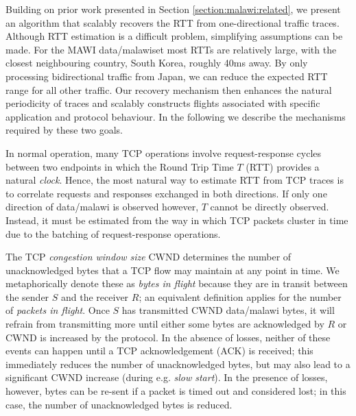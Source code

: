 Building on prior work presented in Section \ref{section:malawi:related}, we present an algorithm that scalably recovers the RTT from one-directional traffic traces. 
Although RTT estimation is a difficult problem, simplifying assumptions
can be made.
For the MAWI data/malawiset most RTTs are relatively large, with the closest neighbouring country, South Korea, roughly 40ms away.
By only processing bidirectional traffic from Japan, we can reduce the expected RTT range for all other traffic.
Our recovery mechanism then enhances the natural periodicity of traces and scalably constructs flights associated with specific application and protocol behaviour.
In the following we describe the mechanisms required by these two goals. 

%
%
In normal operation, many TCP operations involve request-response cycles between two endpoints in which the Round Trip Time $T$ (RTT) provides a natural \emph{clock}. Hence, the most natural way to estimate RTT from TCP traces is to correlate requests and responses exchanged in both directions. If only one direction of data/malawi is observed however, $T$ cannot be directly observed. Instead, it must be estimated from the way in which TCP packets cluster in time due to the batching of request-response operations.

The TCP \emph{congestion window size} CWND determines the number of unacknowledged bytes that a TCP flow may maintain at any point in time. We metaphorically denote these as \emph{bytes in flight} because they are in transit between the sender $S$ and the receiver $R$; an equivalent definition applies for the number of \emph{packets in flight}. Once $S$ has transmitted CWND data/malawi bytes, it will refrain from transmitting more until either some bytes are acknowledged by $R$ or CWND is increased by the protocol.  In the absence of losses, neither of these events can happen until a TCP acknowledgement (ACK) is received; this immediately reduces the number of unacknowledged bytes, but may also lead to a significant CWND increase (during e.g. \emph{slow start}). 
In the presence of losses, however, bytes can be re-sent if a packet is timed out and considered lost; in this case, the number of unacknowledged bytes is reduced.

